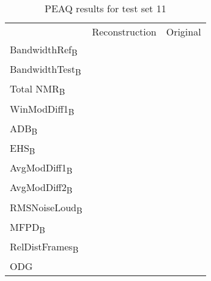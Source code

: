 \begin{table}\begin{center}
\caption{PEAQ results for test set 11}
\label{tab:PEAQdata4}
\begin{tabular}{|l|c|c|}
  \hline
                                    & Reconstruction & Original \\
  BandwidthRef\textsubscript{B}     &                & \\
  BandwidthTest\textsubscript{B}    &                & \\
  Total NMR\textsubscript{B}        &                & \\
  WinModDiff1\textsubscript{B}      &                & \\
  ADB\textsubscript{B}              &                & \\
  EHS\textsubscript{B}              &                & \\
  AvgModDiff1\textsubscript{B}      &                & \\
  AvgModDiff2\textsubscript{B}      &                & \\
  RMSNoiseLoud\textsubscript{B}     &                & \\
  MFPD\textsubscript{B}             &                & \\
  RelDistFrames\textsubscript{B}    &                & \\
  ODG                               &                & \\
  \hline
\end{tabular}
\end{center}\end{table}


